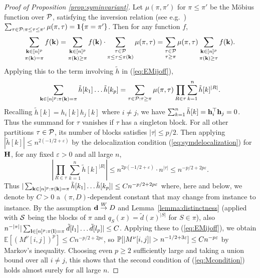 \documentclass[10pt,reqno]{amsart}
\def\E{\mathbb{E}}
\def\toW{\overset{W}{\to}}
\def\1{\mathbf{1}}
\def\eps{\varepsilon}
\begin{document}
\begin{proof}[Proof of Proposition \ref{prop:syminvariant}]
Let $\mu(\pi,\pi')$ for $\pi \leq \pi'$ be the M\"obius function over $\mathcal{P}$,
satisfying the inversion relation
(see e.g.\ \cite[Eq.\ (10.10)]{nica2006lectures})
$\sum_{\tau \in \cP:\pi \leq \tau \leq \pi'} \mu(\pi,\tau)
=\1\{\pi=\pi'\}$. Then for any function $f$,
\begin{equation}\label{eq:inclusionexclusion}
\mathop{\sum_{\mathbf{k} \in [n]^p}}_{\pi(\mathbf{k})=\pi} f(\mathbf{k})
=\mathop{\sum_{\mathbf{k} \in [n]^p}}_{\pi(\mathbf{k}) \geq \pi} f(\mathbf{k}) \cdot
\mathop{\sum_{\tau \in \mathcal{P}}}_{\pi \leq \tau \leq \pi(\mathbf{k})} \mu(\pi,\tau)
=\mathop{\sum_{\tau \in \mathcal{P}}}_{\tau \geq \pi}
\mu(\pi,\tau) \mathop{\sum_{\mathbf{k} \in [n]^p}}_{\pi(\mathbf{k}) \geq \tau} f(\mathbf{k}).
\end{equation}
Applying this to the term involving $\tilde h$ in (\ref{eq:EMijoff}),
\[\sum_{\mathbf{k} \in [n]^p:\pi(\mathbf{k})=\pi} \tilde h[k_1]\ldots \tilde h[k_p]
=\sum_{\tau \in \mathcal{P}:\tau \geq \pi} \mu(\pi,\tau)
\prod_{R \in \tau} \sum_{k=1}^n \tilde h[k]^{|R|}.\]
Recalling $\tilde h[k]=h_i[k]h_j[k]$ where $i \neq j$, we have
$\sum_{k=1}^n \tilde h[k]=\mathbf{h}_i^\top \mathbf{h}_j=0$. Thus the summand for $\tau$
vanishes if $\tau$ has a singleton block.
For all other partitions $\tau \in \mathcal{P}$, its number of blocks satisfies
$|\tau| \leq p/2$. Then applying $|\tilde{h}[k]| \leq n^{2(-1/2+\eps)}$
by the delocalization condition (\ref{eq:symdelocalization}) for $\mathbf{H}$,
for any fixed $\eps>0$ and all large $n$,
\[\left|\prod_{R \in \tau} \sum_{k=1}^n \tilde h[k]^{|R|}\right|
\leq n^{2p(-1/2+\eps)} \cdot n^{|\tau|} \leq n^{-p/2+2p \eps}.\]
Thus $|\sum_{\bk \in [n]^p:\pi(\bk)=\pi} \tilde h[k_1]\ldots \tilde h[k_p]|
\leq Cn^{-p/2+2p \eps}$ where, here and below, we denote by $C>0$ a
$(\pi,D)$-dependent constant that may change from instance to instance.
By the assumption $\bd \toW D$ and
Lemma~\ref{lemma:distinctness} (applied with ${\mathcal{S}}$
being the blocks of $\pi$ and $q_S(x)=\tilde{d}(x)^{|S|}$ for $S \in \pi$),
also
$n^{-|\pi|} |\sum_{\mathbf{l} \in [n]^p:\pi(\mathbf{l})=\pi} \tilde d[l_1]\ldots \tilde d[l_p]| \leq C$.
Applying these to (\ref{eq:EMijoff}), we obtain
$\E[(M^\nu[i,j])^p] \leq Cn^{-p/2+2p \eps}$, so
$\PP[|M^\nu[i,j]|>n^{-1/2+3\eps}] \leq Cn^{-p\eps}$ by Markov's inequality.
Choosing even $p \geq 2$ sufficiently large and taking a union bound over all
$i \neq j$, this shows that the second condition of (\ref{eq:Mcondition}) 
holds almost surely for all large $n$.


\end{proof}
\end{document}
